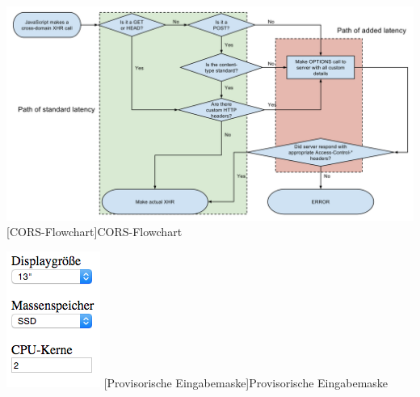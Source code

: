 \begin{appendix}
\vspace{1em}
\begin{minipage}{\linewidth}
	\centering
	\includegraphics[width=1\linewidth]{Abbildungen/mozillaCORS.png}
	[CORS-Flowchart]{CORS-Flowchart}
	\label{app:mozillaCORS}
\end{minipage}
\vspace{1em}

\vspace{1em}
\begin{minipage}{\linewidth}
	\centering
	\includegraphics[width=0.2\linewidth]{Abbildungen/provisorischeEingabemaske.png}
	[Provisorische Eingabemaske]{Provisorische Eingabemaske}
	\label{app:provisorischeEingabemaske}
\end{minipage}
\vspace{1em}


\end{appendix}
